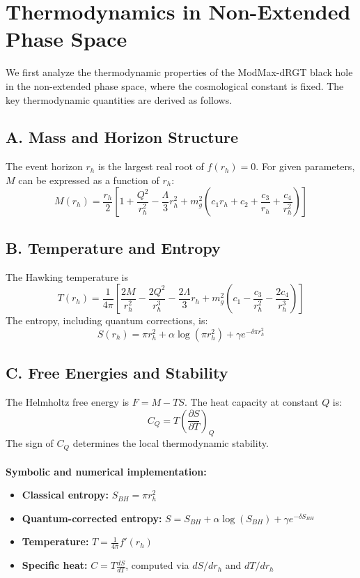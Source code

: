 \documentclass[superscriptaddress, prd, aps,amsmath,amssymb,showpacs,showkeys, onecolumn]{revtex4-2}
\begin{document}
\section{Thermodynamics in Non-Extended Phase Space}
We first analyze the thermodynamic properties of the ModMax-dRGT black hole in the non-extended phase space, where the cosmological constant is fixed. The key thermodynamic quantities are derived as follows.

\subsection*{A. Mass and Horizon Structure}
The event horizon $r_h$ is the largest real root of $f(r_h) = 0$. For given parameters, $M$ can be expressed as a function of $r_h$:
\begin{equation}
M(r_h) = \frac{r_h}{2} \left[ 1 + \frac{Q^2}{r_h^2} - \frac{\Lambda}{3} r_h^2 + m_g^2 (c_1 r_h + c_2 + \frac{c_3}{r_h} + \frac{c_4}{r_h^2}) \right]
\end{equation}

\subsection*{B. Temperature and Entropy}
The Hawking temperature is
\begin{equation}
T(r_h) = \frac{1}{4\pi} \left[ \frac{2M}{r_h^2} - \frac{2Q^2}{r_h^3} - \frac{2\Lambda}{3} r_h + m_g^2 \left(c_1 - \frac{c_3}{r_h^2} - \frac{2c_4}{r_h^3}\right) \right]
\end{equation}
The entropy, including quantum corrections, is:
\begin{equation}
S(r_h) = \pi r_h^2 + \alpha \log(\pi r_h^2) + \gamma e^{-\delta \pi r_h^2}
\end{equation}

\subsection*{C. Free Energies and Stability}
The Helmholtz free energy is $F = M - T S$. The heat capacity at constant $Q$ is:
\begin{equation}
C_Q = T \left( \frac{\partial S}{\partial T} \right)_Q
\end{equation}
The sign of $C_Q$ determines the local thermodynamic stability. \\
\\
\textbf{Symbolic and numerical implementation:}
\begin{itemize}
    \item \textbf{Classical entropy:} $S_{BH} = \pi r_h^2$
    \item \textbf{Quantum-corrected entropy:} $S = S_{BH} + \alpha \log(S_{BH}) + \gamma e^{-\delta S_{BH}}$
    \item \textbf{Temperature:} $T = \frac{1}{4\pi} f'(r_h)$
    \item \textbf{Specific heat:} $C = T \frac{dS}{dT}$, computed via $dS/dr_h$ and $dT/dr_h$
\end{itemize}
\end{document}
